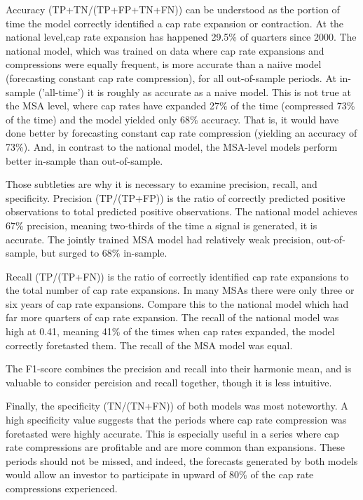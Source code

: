 \documentclass[jrfm,article,submit,oneauthor,pdftex]{Definitions/mdpi}
\begin{document}
Accuracy (TP+TN/(TP+FP+TN+FN)) can be understood as the portion of time the model correctly identified a cap rate expansion or contraction. At the national level,cap rate expansion has happened 29.5\% of quarters since 2000. The national model, which was trained on data where cap rate expansions and compressions were equally frequent, is more accurate than a naiive model (forecasting constant cap rate compression), for all out-of-sample periods. At in-sample ('all-time') it is roughly as accurate as a naive model. This is not true at the MSA level, where cap rates have expanded 27\% of the time (compressed 73\% of the time) and the model yielded only 68\% accuracy. That is, it would have done better by forecasting constant cap rate compression (yielding an accuracy of 73\%). And, in contrast to the national  model, the MSA-level models perform better in-sample than out-of-sample.

Those subtleties are why it is necessary to examine precision, recall, and specificity. Precision (TP/(TP+FP)) is the ratio of correctly predicted positive observations to total predicted positive observations. The national model achieves 67\% precision, meaning two-thirds of the time a signal is generated, it is accurate. The jointly trained MSA model had relatively weak precision, out-of-sample, but surged to 68\% in-sample. 

Recall (TP/(TP+FN)) is the ratio of correctly identified cap rate expansions to the total number of cap rate expansions. In many MSAs there were only three or six years of cap rate expansions. Compare this to the national model which had far more quarters of cap rate expansion. The recall of the national model was high at 0.41, meaning 41\% of the times when cap rates expanded, the model correctly foretasted them. The recall of the MSA model was equal.

The F1-score combines the precision and recall into their harmonic mean, and is valuable to consider percision and recall together, though it is less intuitive. 

Finally, the specificity (TN/(TN+FN)) of both models was most noteworthy. A high specificity value suggests that the periods where cap rate compression was foretasted were highly accurate. This is especially useful in a series where cap rate compressions are profitable and are more common than expansions. These periods should not be missed, and indeed, the forecasts generated by both models would allow an investor to participate in upward of 80\% of the cap rate compressions experienced.
\end{document}
